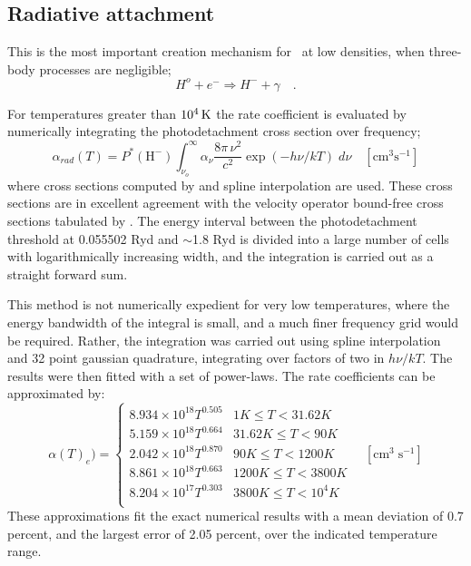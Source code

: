 \subsection{Radiative attachment}

This is the most important creation mechanism for \hminus\ at low densities,
when three-body processes are negligible;
\begin{equation}
{H^o} + {e^ - } \Rightarrow {H^ - } + \gamma \quad .
\end{equation}

For temperatures greater than $10^4 {\rm\thinspace K}$ the rate coefficient is evaluated
by numerically integrating the photodetachment cross section over frequency;
\begin{equation}
{\alpha _{rad}}\left( T \right) = {P^*}\left( {{{\mathrm{H}}^ - }}
\right)\int_{{\nu _o}}^\infty  {{\alpha _\nu }\frac{{8\pi \,{\nu
^2}}}{{{c^2}}}\exp \left( { - h\nu /kT} \right)\;d\nu }\quad  [\mathrm{cm}^3
\mathrm{s}^{-1}]
\end{equation}
where cross sections computed by \citet{Wishart1979} and spline interpolation
are used.  These cross sections are in excellent agreement with the velocity
operator bound-free cross sections tabulated by \citet{Doughty1966}.
The energy interval between the photodetachment threshold at 0.055502 Ryd
and $\sim$1.8 Ryd is divided into a large number of cells with logarithmically
increasing width, and the integration is carried out as a straight forward
sum.

This method is not numerically expedient for very low temperatures, where
the energy bandwidth of the integral is small, and a much finer frequency
grid would be required.  Rather, the integration was carried out using spline
interpolation and 32 point gaussian quadrature, integrating over factors
of two in $h\nu/kT$.  The results were then fitted with a set of power-laws.
The rate coefficients can be approximated by:
\begin{equation}
\alpha(T)_e)=\left\{\begin{array}{lc}
8.934 \times 10^{18}T^{0.505}& 1K\le T < 31.62 K\\
5.159 \times 10^{18}T^{0.664}& 31.62K\le T < 90 K\\
2.042 \times 10^{18}T^{0.870}& 90K\le T < 1200 K\\
8.861 \times 10^{18}T^{0.663}& 1200K\le T < 3800 K\\
8.204 \times 10^{17}T^{0.303}& 3800K\le T < 10^4 K\\
\end{array}\right.\quad [\mathrm{cm}^3\; \mathrm{s}^{-1}]
\end{equation}
These approximations fit the exact numerical results with a mean deviation
of 0.7 percent, and the largest error of 2.05 percent, over the indicated
temperature range.

